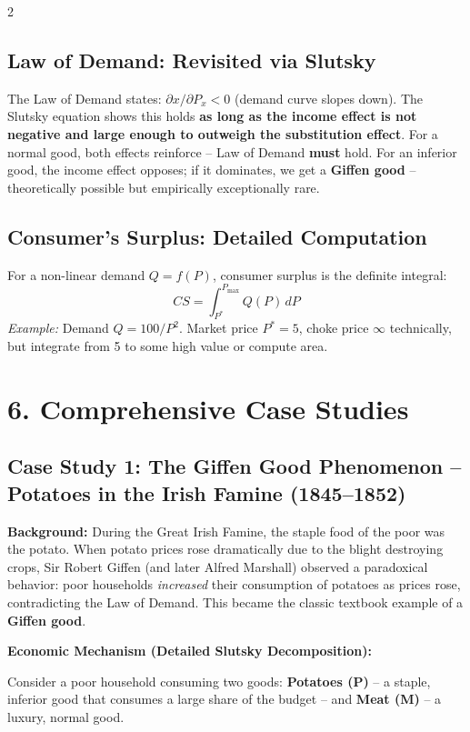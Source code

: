 \documentclass[10pt,a4paper]{article}
\begin{document}
\begin{multicols}{2}
\subsection*{Law of Demand: Revisited via Slutsky}
The Law of Demand states: $\partial x / \partial P_x < 0$ (demand curve slopes down). The Slutsky equation shows this holds \textbf{as long as the income effect is not negative and large enough to outweigh the substitution effect}. For a normal good, both effects reinforce -- Law of Demand \textbf{must} hold. For an inferior good, the income effect opposes; if it dominates, we get a \textbf{Giffen good} -- theoretically possible but empirically exceptionally rare.

\subsection*{Consumer's Surplus: Detailed Computation}
For a non-linear demand $Q = f(P)$, consumer surplus is the definite integral:
\[
CS = \int_{P^*}^{P_{\text{max}}} Q(P) \, dP
\]
\textit{Example:} Demand $Q = 100/P^2$. Market price $P^* = 5$, choke price $\infty$ technically, but integrate from 5 to some high value or compute area.

\section*{6. Comprehensive Case Studies}

\subsection*{Case Study 1: The Giffen Good Phenomenon – Potatoes in the Irish Famine (1845--1852)}

\textbf{Background:} During the Great Irish Famine, the staple food of the poor was the potato. When potato prices rose dramatically due to the blight destroying crops, Sir Robert Giffen (and later Alfred Marshall) observed a paradoxical behavior: poor households \textit{increased} their consumption of potatoes as prices rose, contradicting the Law of Demand. This became the classic textbook example of a \textbf{Giffen good}.

\textbf{Economic Mechanism (Detailed Slutsky Decomposition):}

Consider a poor household consuming two goods: \textbf{Potatoes (P)} -- a staple, inferior good that consumes a large share of the budget -- and \textbf{Meat (M)} -- a luxury, normal good.


\end{multicols}
\end{document}
